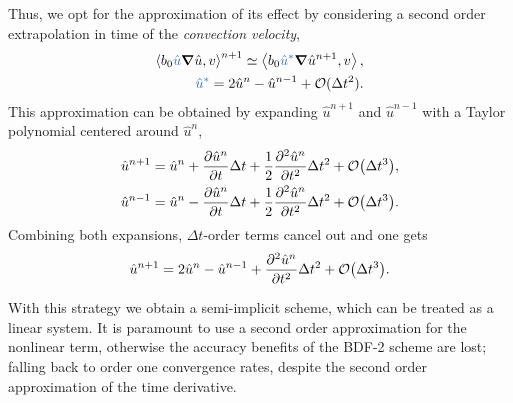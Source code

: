 \documentclass[../../thesis.tex]{subfiles}
\newcommand{\inner}[2]{\left<#1, #2\right>}
\newcommand{\dt}{\ensuremath{\Delta t}}
\begin{document}
Thus, we opt for the approximation of its effect by considering a second order extrapolation in time 
of the \textit{convection velocity},
\begin{subequations}
    \begin{align}
        \inner{b_0 \textcolor{NavyBlue}{\hat{u}} \grad \hat{u}}{v}^{n+1} 
        \simeq 
        \inner{b_0 \textcolor{NavyBlue}{\hat{u}^{*}} \grad \hat{u}^{n+1}}{v}, \\
        \textcolor{NavyBlue}{\hat{u}^{*}} = 2 \hat{u}^{n} - \hat{u}^{n-1} + \mathcal{O}(\dt^2).
        \label{eq:semi_implicit_approximation_convective_term}
    \end{align}
\end{subequations}
This approximation can be obtained by expanding $\hat{u}^{n+1}$ and $\hat{u}^{n-1}$
with a Taylor polynomial centered around $\hat{u}^{n}$,
\begin{subequations}
    \begin{align}
        \hat{u}^{n+1} &= \hat{u}^{n} 
        + \pdv{\hat{u}^{n}}{t} \dt 
        + \frac{1}{2}\pdv[2]{\hat{u}^{n}}{t} \dt^2 
        + \mathcal{O}\qty(\dt^3),
        \\
        \hat{u}^{n-1} &= \hat{u}^{n} 
        - \pdv{\hat{u}^{n}}{t} \dt 
        + \frac{1}{2}\pdv[2]{\hat{u}^{n}}{t} \dt^2 
        + \mathcal{O}\qty(\dt^3).
    \end{align}
\end{subequations}
Combining both expansions, \dt-order terms cancel out and one gets
\begin{equation}
    \hat{u}^{n+1} = 
    2 \hat{u}^{n} 
    -\hat{u}^{n-1} 
    + \pdv[2]{\hat{u}^{n}}{t} \dt^2 
    + \mathcal{O}\qty(\dt^3).
\end{equation}

With this strategy we obtain a semi-implicit scheme, which can be treated as a linear system.
It is paramount to use a second order approximation for the nonlinear term,
otherwise the accuracy benefits of the BDF-2 scheme are lost;
falling back to order one convergence rates, 
despite the second order approximation of the time derivative.
\end{document}
